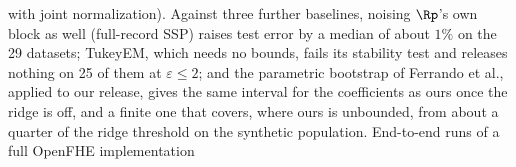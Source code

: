 %
%

with joint normalization). Against three further baselines, noising $\Rp$'s own block as well (full-record SSP) raises test error by a median of about $1\%$ on the 29 datasets; TukeyEM, which needs no bounds, fails its stability test and releases nothing on 25 of them at $\varepsilon \le 2$; and the parametric bootstrap of Ferrando et al., applied to our release, gives the same interval for the coefficients as ours once the ridge is off, and a finite one that covers, where ours is unbounded, from about a quarter of the ridge threshold on the synthetic population. End-to-end runs of a full OpenFHE implementation

